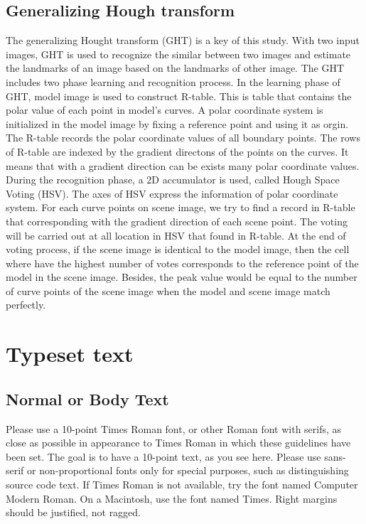 \documentclass[twoside,twocolumn,10pt]{article}
\begin{document}
\subsection{Generalizing Hough transform}
The generalizing Hought transform (GHT)\cite{Ballard} is a key of this study. With two input images, GHT is used to recognize the similar between two images and estimate the landmarks of an image based on the landmarks of other image. The GHT includes two phase learning and recognition process. In the learning phase of GHT, model image is used to construct R-table. This is table that contains the polar value of each point in model's curves. A polar coordinate system is initialized in the model image by fixing a reference point and using it as orgin. The R-table records the polar coordinate values of all boundary points. The rows of R-table are indexed by the gradient directons of the points on the curves. It means that with a gradient direction can be exists many polar coordinate values. During the recognition phase, a 2D accumulator is used, called Hough Space Voting (HSV). The axes of HSV express the information of polar coordinate system. For each curve points on scene image, we try to find a record in R-table that corresponding with the gradient direction of each scene point. The voting will be carried out at all location in HSV that found in R-table. At the end of voting process, if the scene image is identical to the model image, then the cell where have the highest number of votes corresponds to the reference point of the model in the scene image. Besides, the peak value would be equal to the number of curve points of the scene image when the model and scene image match perfectly.
\section{Typeset text}
\subsection*{Normal or Body Text}
Please use a 10-point Times Roman font, or other Roman font with serifs, as close as possible in appearance to Times Roman in which these guidelines have been set. The goal is to have a 10-point text, as you see here. Please use sans-serif or non-proportional fonts only for special purposes, such as distinguishing source code text. If Times Roman is not available, try the font named Computer Modern Roman. On a Macintosh, use the font named Times.  Right margins should be justified, not ragged.
\end{document}
